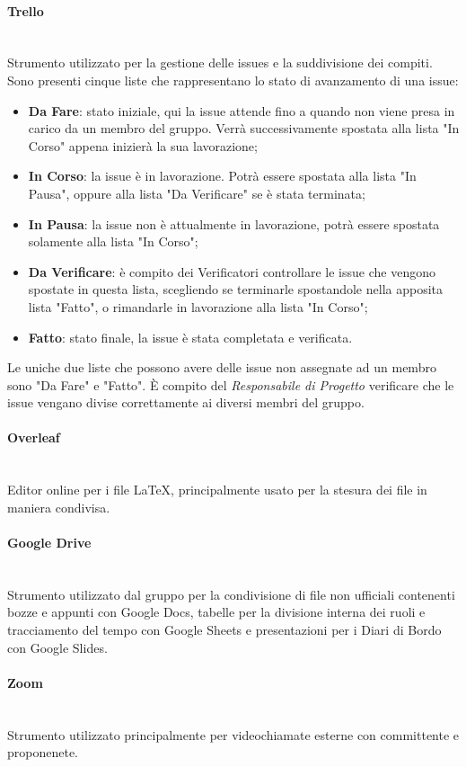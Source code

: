 \documentclass{article}
\begin{document}
\paragraph{Trello}~\\
Strumento utilizzato per la gestione delle issues e la suddivisione dei compiti. Sono presenti cinque liste che rappresentano lo stato di avanzamento di una issue:
\begin{itemize} 
    \item\textbf{Da Fare}: stato iniziale, qui la issue attende fino a quando non viene presa in carico da un membro del gruppo. Verrà successivamente spostata alla lista "In Corso" appena inizierà la sua lavorazione;
    \item\textbf{In Corso}: la issue è in lavorazione. Potrà essere spostata alla lista "In Pausa", oppure alla lista "Da Verificare" se è stata terminata;
    \item\textbf{In Pausa}: la issue non è attualmente in lavorazione, potrà essere spostata solamente alla lista "In Corso";
    \item\textbf{Da Verificare}: è compito dei Verificatori controllare le issue che vengono spostate in questa lista, scegliendo se terminarle spostandole nella apposita lista "Fatto", o rimandarle in lavorazione alla lista "In Corso";
    \item\textbf{Fatto}: stato finale, la issue è stata completata e verificata.
\end{itemize}
Le uniche due liste che possono avere delle issue non assegnate ad un membro sono "Da Fare" e "Fatto".
È compito del \textit{Responsabile di Progetto} verificare che le issue vengano divise correttamente ai diversi membri del gruppo. 
\paragraph{Overleaf}~\\
Editor online per i file LaTeX, principalmente usato per la stesura dei file in maniera condivisa.
\paragraph{Google Drive}~\\
Strumento utilizzato dal gruppo per la condivisione di file non ufficiali contenenti bozze e appunti con Google Docs, tabelle per la divisione interna dei ruoli e tracciamento del tempo con Google Sheets e presentazioni per i Diari di Bordo con Google Slides. 
\paragraph{Zoom}~\\
Strumento utilizzato principalmente per videochiamate esterne con committente e proponenete.
\end{document}
